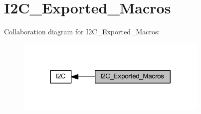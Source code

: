\hypertarget{group___i2_c___exported___macros}{}\section{I2\+C\+\_\+\+Exported\+\_\+\+Macros}
\label{group___i2_c___exported___macros}
Collaboration diagram for I2\+C\+\_\+\+Exported\+\_\+\+Macros\+:
\nopagebreak
\begin{figure}[H]
\begin{center}
\leavevmode
\includegraphics[width=260pt]{group___i2_c___exported___macros}
\end{center}
\end{figure}
